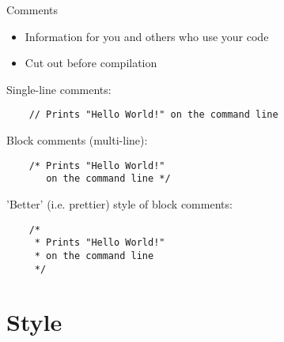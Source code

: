 \begin{frame}[fragile]{Comments}
	\begin{itemize}
		\item Information for you and others who use your code
		\item Cut out before compilation
	\end{itemize}
	Single-line comments:
	\begin{lstlisting}
	// Prints "Hello World!" on the command line
\end{lstlisting}
	Block comments (multi-line):
	\begin{lstlisting}
	/* Prints "Hello World!"
	   on the command line */
\end{lstlisting}
	'Better' (i.e. prettier) style of block comments:
	\begin{lstlisting}
	/*
	 * Prints "Hello World!"
	 * on the command line
	 */
\end{lstlisting}
\end{frame}
\section{Style}
